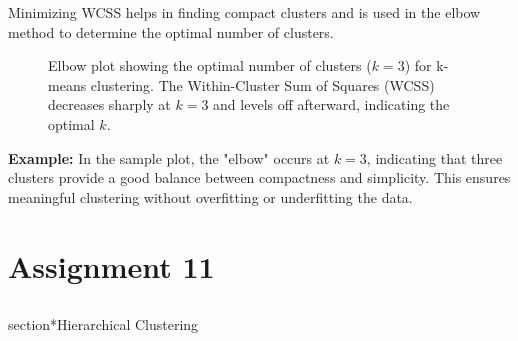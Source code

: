 \documentclass{article}
\begin{document}
Minimizing WCSS helps in finding compact clusters and is used in the elbow method to determine the optimal number of clusters.


\begin{figure}[H]
\centering
{}

\caption{Elbow plot showing the optimal number of clusters ($k=3$) for k-means clustering. The Within-Cluster Sum of Squares (WCSS) decreases sharply at $k=3$ and levels off afterward, indicating the optimal $k$.}
\label{fig:elbow_plot}
\end{figure}

\textbf{Example:} In the sample plot, the "elbow" occurs at \(k=3\), indicating that three clusters provide a good balance between compactness and simplicity. This ensures meaningful clustering without overfitting or underfitting the data.

\section{Assignment 11}

\subsection{}section*{Hierarchical Clustering}
\end{document}

